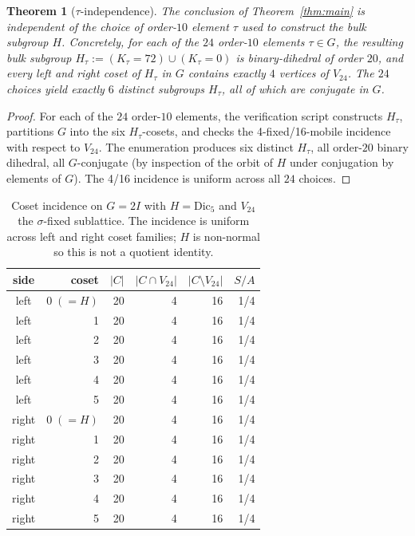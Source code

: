 \documentclass[11pt]{article}
\newtheorem{theorem}{Theorem}[section]
\newcommand{\twoI}{2I}
\newcommand{\Dicfive}{\mathrm{Dic}_5}
\newcommand{\Vtwentyfour}{V_{24}}
\newcommand{\sigmaG}{\sigma}
\begin{document}
\begin{theorem}[$\tau$-independence]\label{thm:taunoindep}
The conclusion of Theorem~\ref{thm:main} is independent of the choice
of order-$10$ element $\tau$ used to construct the bulk subgroup $H$.
Concretely, for each of the $24$ order-$10$ elements $\tau \in G$,
the resulting bulk subgroup $H_\tau := (K_\tau = 72) \cup (K_\tau = 0)$
is binary-dihedral of order $20$, and every left and right coset of
$H_\tau$ in $G$ contains exactly $4$ vertices of $\Vtwentyfour$. The
$24$ choices yield exactly $6$ distinct subgroups $H_\tau$, all of
which are conjugate in $G$.
\end{theorem}

\begin{proof}
For each of the $24$ order-$10$ elements, the verification script
constructs $H_\tau$, partitions $G$ into the six $H_\tau$-cosets, and
checks the 4-fixed/16-mobile incidence with respect to $\Vtwentyfour$.
The enumeration produces six distinct $H_\tau$, all order-$20$ binary
dihedral, all $G$-conjugate (by inspection of the orbit of $H$ under
conjugation by elements of $G$). The 4/16 incidence is uniform across
all $24$ choices.
\end{proof}

\begin{table}[h]
\centering
\caption{Coset incidence on $G = \twoI$ with $H = \Dicfive$ and
$\Vtwentyfour$ the $\sigmaG$-fixed sublattice. The incidence is uniform
across left and right coset families; $H$ is non-normal so this is not
a quotient identity.}
\label{tab:incidence}
\begin{tabular}{c r r r r r}
\toprule
side & coset & $|C|$ & $|C \cap \Vtwentyfour|$ & $|C \setminus \Vtwentyfour|$ & $S/A$ \\
\midrule
left  & $0\;(=H)$ & 20 & 4 & 16 & 1/4 \\
left  & 1 & 20 & 4 & 16 & 1/4 \\
left  & 2 & 20 & 4 & 16 & 1/4 \\
left  & 3 & 20 & 4 & 16 & 1/4 \\
left  & 4 & 20 & 4 & 16 & 1/4 \\
left  & 5 & 20 & 4 & 16 & 1/4 \\
\midrule
right & $0\;(=H)$ & 20 & 4 & 16 & 1/4 \\
right & 1 & 20 & 4 & 16 & 1/4 \\
right & 2 & 20 & 4 & 16 & 1/4 \\
right & 3 & 20 & 4 & 16 & 1/4 \\
right & 4 & 20 & 4 & 16 & 1/4 \\
right & 5 & 20 & 4 & 16 & 1/4 \\
\bottomrule
\end{tabular}
\end{table}
\end{document}
